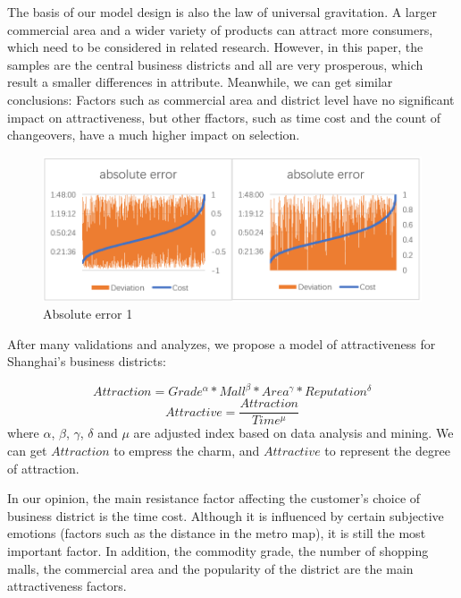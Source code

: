 \documentclass[journal,transmag]{IEEEtran}
\begin{document}
The basis of our model design is also the law of universal gravitation. A larger commercial area and a wider variety of products can attract more consumers, which need to be considered in related research. However, in this paper, the samples are the central business districts and all are very prosperous, which result a smaller differences in attribute. Meanwhile, we can get similar conclusions: Factors such as commercial area and district level have no significant impact on attractiveness, but other ffactors, such as time cost and the count of changeovers, have a much higher impact on selection.

\begin{figure}[tb]
\centering
\includegraphics[width=1\columnwidth]{figure6.png}
\caption{Absolute error 1}
\label{fig:Absolute-error 1}
\end{figure}

After many validations and analyzes, we propose a model of attractiveness for Shanghai's business districts:

\begin{equation}
Attraction=Grade^{\alpha}*Mall^{\beta}*Area^{\gamma}*Reputation^{\delta} 
\end{equation}
\begin{equation}
Attractive=\frac{Attraction}{Time^{\mu}}
\end{equation}
where $\alpha$, $\beta$, $\gamma$, $\delta$ and $\mu$ are adjusted index based on data analysis and mining. We can get $Attraction$ to empress the charm, and $Attractive$ to represent the degree of attraction.

In our opinion, the main resistance factor affecting the customer's choice of business district is the time cost. Although it is influenced by certain subjective emotions (factors such as the distance in the metro map), it is still the most important factor. In addition, the commodity grade, the number of shopping malls, the commercial area and the popularity of the district are the main attractiveness factors.
\end{document}
